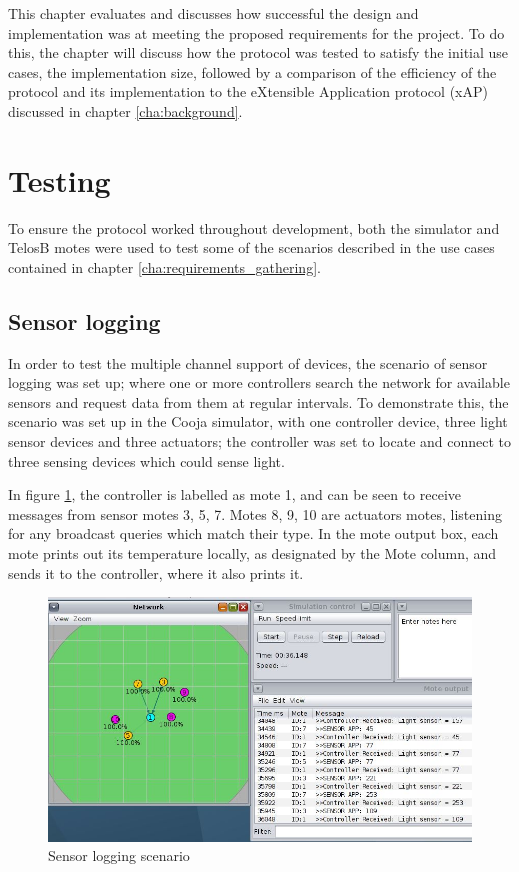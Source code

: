 This chapter evaluates and discusses how successful the design and implementation was at meeting the proposed requirements for the project. To do this, the chapter will discuss how the protocol was tested to satisfy the initial use cases, the implementation size, followed by a comparison of the efficiency of the protocol and its implementation to the eXtensible Application protocol (xAP) discussed in chapter \ref{cha:background}.


\section{Testing} %
\label{sec:testing}
To ensure the protocol worked throughout development, both the simulator and TelosB motes were used to test some of the scenarios described in the use cases contained in chapter \ref{cha:requirements_gathering}.
\subsection{Sensor logging} %
\label{sub:sensor_logging}
In order to test the multiple channel support of devices, the scenario of sensor logging was set up; where one or more controllers search the network for available sensors and request data from them at regular intervals.
To demonstrate this, the scenario was set up in the Cooja simulator, with one controller device, three light sensor devices and three actuators; the controller was set to locate and connect to three sensing devices which could sense light.

In figure \ref{fig:logtest}, the controller is labelled as mote 1, and can be seen to receive messages from sensor motes 3, 5, 7. Motes 8, 9, 10 are actuators motes, listening for any broadcast queries which match their type. In the mote output box, each mote prints out its temperature locally, as designated by the Mote column, and sends it to the controller, where it also prints it.

\begin{figure}[h]
\centering
\includegraphics[scale=0.5]{evaluation/img/logTest.jpg}
\caption{Sensor logging scenario}
\label{fig:logtest}
\end{figure}  

